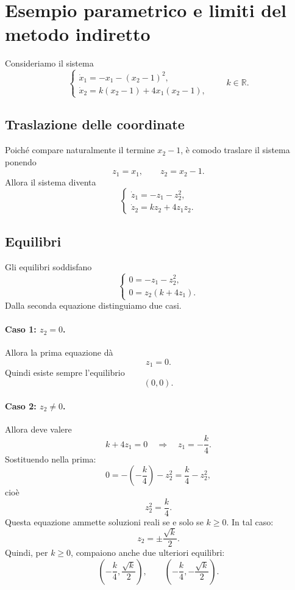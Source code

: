 \section{Esempio parametrico e limiti del metodo indiretto}

Consideriamo il sistema
\begin{equation}
\label{eq:L22-esempio-parametrico}
\begin{cases}
\dot x_1 = -x_1-(x_2-1)^2,\\[4pt]
\dot x_2 = k(x_2-1)+4x_1(x_2-1),
\end{cases}
\qquad k\in\mathbb{R}.
\end{equation}

\subsection{Traslazione delle coordinate}

Poiché compare naturalmente il termine \(x_2-1\), è comodo traslare il sistema ponendo
\[
z_1=x_1,
\qquad
z_2=x_2-1.
\]
Allora il sistema diventa
\begin{equation}
\label{eq:L22-z}
\begin{cases}
\dot z_1 = -z_1-z_2^2,\\[4pt]
\dot z_2 = kz_2+4z_1z_2.
\end{cases}
\end{equation}

\subsection{Equilibri}

Gli equilibri soddisfano
\[
\begin{cases}
0=-z_1-z_2^2,\\
0=z_2(k+4z_1).
\end{cases}
\]
Dalla seconda equazione distinguiamo due casi.

\paragraph{Caso 1: \(z_2=0\).}
Allora la prima equazione dà
\[
z_1=0.
\]
Quindi esiste sempre l'equilibrio
\[
(0,0).
\]

\paragraph{Caso 2: \(z_2\neq 0\).}
Allora deve valere
\[
k+4z_1=0
\quad \Longrightarrow \quad
z_1=-\frac{k}{4}.
\]
Sostituendo nella prima:
\[
0=-\left(-\frac{k}{4}\right)-z_2^2
=
\frac{k}{4}-z_2^2,
\]
cioè
\[
z_2^2=\frac{k}{4}.
\]
Questa equazione ammette soluzioni reali se e solo se \(k\ge 0\). In tal caso:
\[
z_2=\pm \frac{\sqrt{k}}{2}.
\]
Quindi, per \(k\ge 0\), compaiono anche due ulteriori equilibri:
\[
\left(-\frac{k}{4},\frac{\sqrt{k}}{2}\right),
\qquad
\left(-\frac{k}{4},-\frac{\sqrt{k}}{2}\right).
\]

